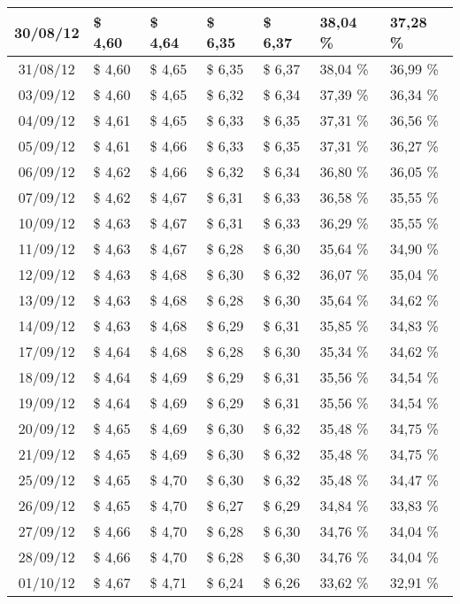\begin{center}
\begin{longtable}{|c|p{1.5cm}|p{1.5cm}|p{1.5cm}|p{1.5cm}|p{1.5cm}|p{1.5cm}|}
30/08/12 & \$ 4,60 & \$ 4,64 & \$ 6,35 & \$ 6,37 & 38,04 \% & 37,28 \% \\ \hline
31/08/12 & \$ 4,60 & \$ 4,65 & \$ 6,35 & \$ 6,37 & 38,04 \% & 36,99 \% \\ \hline
03/09/12 & \$ 4,60 & \$ 4,65 & \$ 6,32 & \$ 6,34 & 37,39 \% & 36,34 \% \\ \hline
04/09/12 & \$ 4,61 & \$ 4,65 & \$ 6,33 & \$ 6,35 & 37,31 \% & 36,56 \% \\ \hline
05/09/12 & \$ 4,61 & \$ 4,66 & \$ 6,33 & \$ 6,35 & 37,31 \% & 36,27 \% \\ \hline
06/09/12 & \$ 4,62 & \$ 4,66 & \$ 6,32 & \$ 6,34 & 36,80 \% & 36,05 \% \\ \hline
07/09/12 & \$ 4,62 & \$ 4,67 & \$ 6,31 & \$ 6,33 & 36,58 \% & 35,55 \% \\ \hline
10/09/12 & \$ 4,63 & \$ 4,67 & \$ 6,31 & \$ 6,33 & 36,29 \% & 35,55 \% \\ \hline
11/09/12 & \$ 4,63 & \$ 4,67 & \$ 6,28 & \$ 6,30 & 35,64 \% & 34,90 \% \\ \hline
12/09/12 & \$ 4,63 & \$ 4,68 & \$ 6,30 & \$ 6,32 & 36,07 \% & 35,04 \% \\ \hline
13/09/12 & \$ 4,63 & \$ 4,68 & \$ 6,28 & \$ 6,30 & 35,64 \% & 34,62 \% \\ \hline
14/09/12 & \$ 4,63 & \$ 4,68 & \$ 6,29 & \$ 6,31 & 35,85 \% & 34,83 \% \\ \hline
17/09/12 & \$ 4,64 & \$ 4,68 & \$ 6,28 & \$ 6,30 & 35,34 \% & 34,62 \% \\ \hline
18/09/12 & \$ 4,64 & \$ 4,69 & \$ 6,29 & \$ 6,31 & 35,56 \% & 34,54 \% \\ \hline
19/09/12 & \$ 4,64 & \$ 4,69 & \$ 6,29 & \$ 6,31 & 35,56 \% & 34,54 \% \\ \hline
20/09/12 & \$ 4,65 & \$ 4,69 & \$ 6,30 & \$ 6,32 & 35,48 \% & 34,75 \% \\ \hline
21/09/12 & \$ 4,65 & \$ 4,69 & \$ 6,30 & \$ 6,32 & 35,48 \% & 34,75 \% \\ \hline
25/09/12 & \$ 4,65 & \$ 4,70 & \$ 6,30 & \$ 6,32 & 35,48 \% & 34,47 \% \\ \hline
26/09/12 & \$ 4,65 & \$ 4,70 & \$ 6,27 & \$ 6,29 & 34,84 \% & 33,83 \% \\ \hline
27/09/12 & \$ 4,66 & \$ 4,70 & \$ 6,28 & \$ 6,30 & 34,76 \% & 34,04 \% \\ \hline
28/09/12 & \$ 4,66 & \$ 4,70 & \$ 6,28 & \$ 6,30 & 34,76 \% & 34,04 \% \\ \hline
01/10/12 & \$ 4,67 & \$ 4,71 & \$ 6,24 & \$ 6,26 & 33,62 \% & 32,91 \% \\ \hline

\end{longtable}
\end{center}
